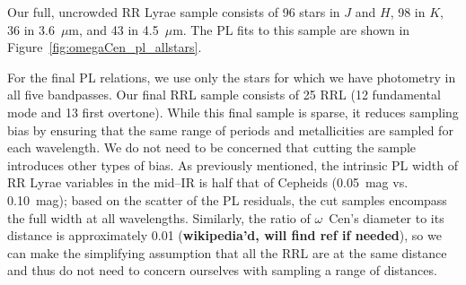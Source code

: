 \documentclass[a4paper,fleqn,usenatbib]{mnras}
\begin{document}





Our full, uncrowded RR Lyrae sample consists of 96 stars in $J$ and $H$, 98 in $K$, 36 in 3.6~$\mu$m, and 43 in 4.5~$\mu$m. The PL fits to this sample are shown in Figure~\ref{fig:omegaCen_pl_allstars}.

For the final PL relations, we use only the stars for which we have photometry in all five bandpasses. Our final RRL sample consists of 25 RRL (12 fundamental mode and 13 first overtone). While this final sample is sparse, it reduces sampling bias by ensuring that the same range of periods and metallicities are sampled for each wavelength. We do not need to be concerned that cutting the sample introduces other types of bias. As previously mentioned, the intrinsic PL width of RR Lyrae variables in the mid--IR is half that of Cepheids (0.05~mag vs. 0.10~mag); based on the scatter of the PL residuals, the cut samples encompass the full width at all wavelengths. Similarly, the ratio of $\omega$~Cen's diameter to its distance is approximately 0.01 ({\bf wikipedia'd, will find ref if needed}), so we can make the simplifying assumption that all the RRL are at the same distance and thus do not need to concern ourselves with sampling a range of distances.
\end{document}
